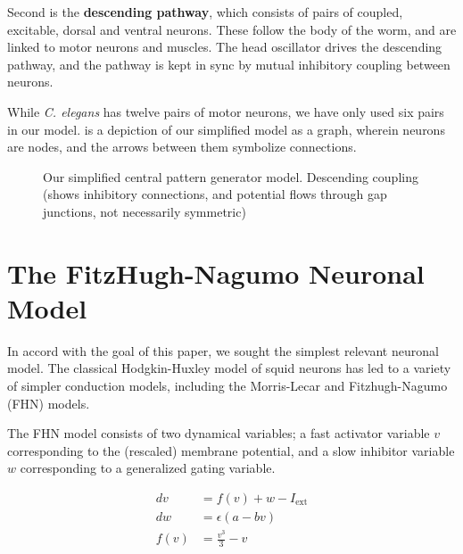 \documentclass[
    11pt,
]{article}
\begin{document}
Second is the \textbf{descending pathway}, which consists of pairs of coupled, excitable, dorsal and ventral neurons.  These follow the body of the worm, and are linked to motor neurons and muscles.  The head oscillator drives the descending pathway, and the pathway is kept in sync by mutual inhibitory coupling between neurons.


While \textit{C. elegans} has twelve pairs of motor neurons, we have only used six pairs in our model.   is a depiction of our simplified model as a graph, wherein neurons are nodes, and the arrows between them symbolize connections.

\begin{figure}[h!]
    \label{fig: cpg}
    \centering
    \caption{Our simplified central pattern generator model.  Descending coupling (shows inhibitory connections, and potential flows through gap junctions, not necessarily symmetric)}
\end{figure} %

\section{The FitzHugh-Nagumo Neuronal Model}\label{sec: fhn}

In accord with the goal of this paper, we sought the simplest relevant neuronal model.  The classical Hodgkin-Huxley\cite{hodgkin1952} model of squid neurons has led to a variety of simpler conduction models, including the Morris-Lecar\cite{morris1981} and Fitzhugh-Nagumo (FHN) models.

The FHN model consists of two dynamical variables; a fast activator variable $v$ corresponding to the (rescaled) membrane potential, and a slow inhibitor variable $w$ corresponding to a generalized gating variable.

\begin{equation} %
    \label{eq: fhn}
    \begin{aligned}
        dv &= f(v) + w - I_\mathrm{ext}\\
        dw &= \epsilon (a - bv)\\
        f(v) &= \frac{v^3}{3} - v
    \end{aligned}
\end{equation}
\end{document}
